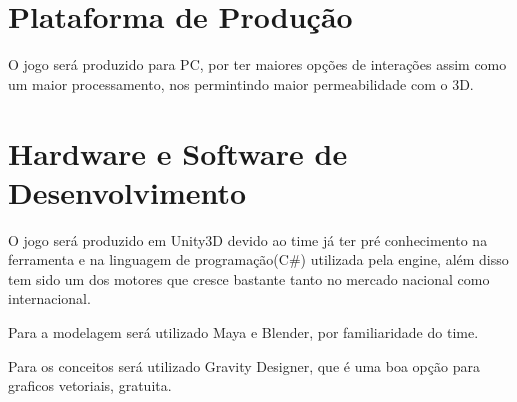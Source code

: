 
\section{Plataforma de Produção}

O jogo será produzido para PC, por ter maiores opções de interações assim como um maior processamento, nos permintindo maior permeabilidade com o 3D.


\section{Hardware e Software de Desenvolvimento}

O jogo será produzido em Unity3D devido ao time já ter pré conhecimento na ferramenta e na linguagem de programação(C\#) utilizada pela engine, além disso tem sido um dos motores que cresce bastante tanto no mercado nacional como internacional.

Para a modelagem será utilizado Maya e Blender, por familiaridade do time.

Para os conceitos será utilizado Gravity Designer, que é uma boa opção para graficos vetoriais, gratuita.



